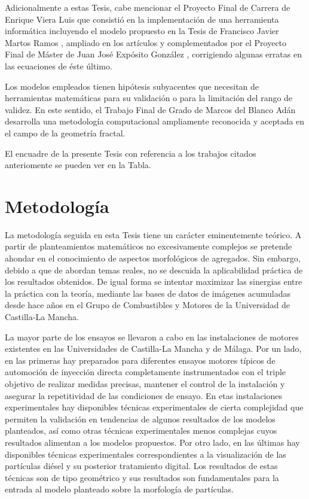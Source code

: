 \par Adicionalmente a estas Tesis, cabe mencionar el Proyecto Final de Carrera de Enrique Viera Luis \cite{vieraPFC:2014} que consistió en la implementación de una herramienta informática incluyendo el modelo propuesto en la Tesis de Francisco Javier Martos Ramos \cite{martosphD:2006}, ampliado en los artículos \cite{lapuertaetal:2010} y complementados por el Proyecto Final de Máster de Juan José Expósito González \cite{expositoPFM:2012}, corrigiendo algunas erratas en las ecuaciones de éste último. 

\par Los modelos empleados tienen hipótesis subyacentes que necesitan de herramientas matemáticas para su validación o para la limitación del rango de validez. En este sentido, el Trabajo Final de Grado de Marcos del Blanco Adán \cite{delblancoPFC:2015} desarrolla una metodología computacional ampliamente reconocida y aceptada en el campo de la geometría fractal.
\par El encuadre de la presente Tesis con referencia a los trabajos citados anteriomente se pueden ver en la Tabla.

\section{Metodología}\label{sec:Metodologia}

\par La metodología seguida en esta Tesis tiene un carácter eminentemente teórico. A partir de planteamientos matemáticos no excesivamente complejos se pretende ahondar en el conocimiento de aspectos morfológicos de agregados. Sin embargo, debido a que de abordan temas reales, no se descuida la aplicabilidad práctica de los resultados obtenidos. De igual forma se intentar maximizar las sinergias entre la práctica con la teoría, mediante las bases de datos de imágenes acumuladas desde hace años en el Grupo de Combustibles y Motores de la Universidad de Castilla-La Mancha.

\par La mayor parte de los ensayos se llevaron a cabo en las instalaciones de motores existentes en las Universidades de Castilla-La Mancha y de Málaga. Por un lado, en las primeras hay preparados para diferentes ensayos motores típicos de automoción de inyección directa completamente instrumentados con el triple objetivo de realizar medidas precisas, mantener el control de la instalación y asegurar la repetitividad de las condiciones de ensayo. En etas instalaciones experimentales hay disponibles técnicas experimentales de cierta complejidad que permiten la validación en tendencias de algunos resultados de los modelos planteados, así como otras técnicas experimentales menos complejas cuyos resultados alimentan a los modelos propuestos. Por otro lado, en las últimas hay disponibles técnicas experimentales correspondientes a la visualización de las partículas diésel y su posterior tratamiento digital. Los resultados de estas técnicas son de tipo geométrico y sus resultados son fundamentales para la entrada al modelo planteado sobre la morfología de partículas.

